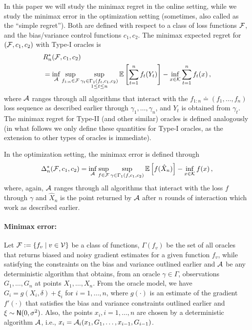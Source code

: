 In this paper we will study the minimax regret in the online setting, while we study the minimax error in the optimization setting (sometimes, also called as the ``simple regret'').
Both are defined with respect to a class of loss functions $\mathcal{F}$, and the bias/variance control functions $c_1,c_2$.
The minimax expected regret for $(\mathcal{F},c_1,c_2)$ with Type-I oracles is
\begin{align*}
\MoveEqLeft
R_n^*(\cF,c_1,c_2) \\
\MoveEqLeft
= \inf_{\cA} \sup_{f_{1:n}\in \cF} 
	\sup_{\substack{\gamma_t \in \Gamma_1(f_t,c_1,c_2)\\1\le t \le n}} 
\EE{ \sum_{t=1}^n f_t(Y_t) }  
-\inf_{x\in \cK} \sum_{t=1}^n f_t(x)\,,\\
\end{align*}
where $\mathcal{A}$ ranges through all algorithms that interact with the $f_{1:n}\doteq (f_1,\dots,f_n)$ loss sequence
as described earlier
through $\gamma_1,\dots,\gamma_n$,
and $Y_t$ is obtained from $\gamma_t$. The minimax regret for Type-II (and other similar) oracles is defined analogously (in what follows we only define these quantities for Type-I oracles, as the extension to other types of oracles is immediate).

In the optimization setting, the minimax error is defined through
\begin{align*}
\Delta_n^*(\mathcal{F},c_1,c_2)
= \inf_{\mathcal{A}} \sup_{f \in \mathcal{F}} \sup_{\gamma\in \Gamma_1(f,c_1,c_2)}  \mathbb{E}\left[ f(\hat{X}_n) \right] - \inf_{x\in \mathcal{K}}  f(x)\,,
\end{align*}
where, again, $\mathcal{A}$ ranges through all algorithms that interact with the loss $f$ through $\gamma$ and $\hat{X}_n$ is the point returned by $\mathcal{A}$ after $n$ rounds of interaction which work as described earlier.


\paragraph{Minimax error:}
Let $\mathcal{F}:= \{ f_v \mid v \in \mathcal{V}\}$ be a class of functions, $\Gamma(f_v)$ be the set of all oracles that returns biased and noisy gradient estimates for a given  function $f_v$, while satisfying the constraints on the bias and variance outlined earlier and $\mathcal{A}$ be any deterministic algorithm that obtains, from an oracle $\gamma \in \Gamma$, observations $G_1, \ldots, G_n$ at points $X_1, \ldots, X_n$. From the oracle model, we have 
$G_i = g(X_i,\delta) + \xi_i$ for $i=1,\ldots,n$, where $g(\cdot)$ is an estimate of the gradient $f'(\cdot)$ that satisfies the bias and variance constraints outlined earlier and $\xi \sim \mathsf{N}(0,\sigma^2)$. Also, the points $x_i, i=1,\ldots,n$ are chosen by a deterministic algorithm $\mathcal{A}$, i.e., 
$x_i = \mathcal{A}_i(x_1, G_1, \ldots, x_{i-1}, G_{i-1})$. 

